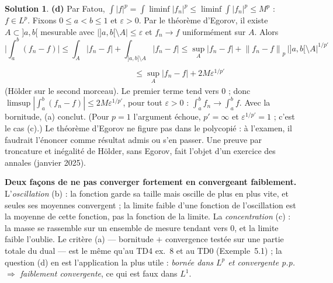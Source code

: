 \documentclass[11pt,a4paper]{article}
\newcommand{\norm}[1]{\left\|#1\right\|}
\theoremstyle{definition}
\newtheorem*{solution}{Solution}
\begin{document}
\begin{solution}
\medskip
\noindent\textbf{(d)} Par Fatou, $\int|f|^p=\int\liminf|f_n|^p\le\liminf\int|f_n|^p\le M^p$ : $f\in L^p$. Fixons $0\le a<b\le1$ et $\varepsilon>0$. Par le théorème d'Egorov, il existe $A\subset]a,b[$ mesurable avec $|{]a,b[}\setminus A|\le\varepsilon$ et $f_n\to f$ uniformément sur $A$. Alors
\[
\Big|\int_a^b(f_n-f)\Big|\le\int_A|f_n-f|+\int_{]a,b[\setminus A}|f_n-f|
\le\sup_A|f_n-f|+\norm{f_n-f}_p\,|{]a,b[}\setminus A|^{1/p'}
\]
\[
\phantom{\Big|\int_a^b(f_n-f)\Big|}\le\sup_A|f_n-f|+2M\varepsilon^{1/p'}
\]
(Hölder sur le second morceau). Le premier terme tend vers $0$ ; donc $\limsup|\int_a^b(f_n-f)|\le2M\varepsilon^{1/p'}$, pour tout $\varepsilon>0$ : $\int_a^bf_n\to\int_a^bf$. Avec la bornitude, (a) conclut. (Pour $p=1$ l'argument échoue, $p'=\infty$ et $\varepsilon^{1/p'}=1$ ; c'est le cas (c).) Le théorème d'Egorov ne figure pas dans le polycopié : à l'examen, il faudrait l'énoncer comme résultat admis ou s'en passer. Une preuve par troncature et inégalité de Hölder, sans Egorov, fait l'objet d'un exercice des annales (janvier 2025).
\end{solution}

\begin{pointcle}
\textbf{Deux façons de ne pas converger fortement en convergeant faiblement.} L'\emph{oscillation} (b) : la fonction garde sa taille mais oscille de plus en plus vite, et seules ses moyennes convergent ; la limite faible d'une fonction de l'oscillation est la moyenne de cette fonction, pas la fonction de la limite. La \emph{concentration} (c) : la masse se rassemble sur un ensemble de mesure tendant vers $0$, et la limite faible l'oublie. Le critère (a) — bornitude $+$ convergence testée sur une partie totale du dual — est le même qu'au TD4 ex.~8 et au TD0 (Exemple~5.1) ; la question (d) en est l'application la plus utile : \emph{bornée dans $L^p$ et convergente p.p. $\Rightarrow$ faiblement convergente}, ce qui est faux dans $L^1$.
\end{pointcle}
\end{document}
